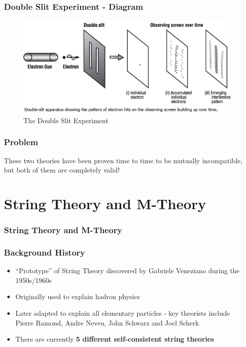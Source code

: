 \documentclass{beamer}
\begin{document}
\begin{frame}
\frametitle{Double Slit Experiment - Diagram}
\begin{figure}
\includegraphics[width=\textwidth]{double-slit-experiment.jpg}
\caption{\label{fig:experiment}The Double Slit Experiment}
\end{figure}

\end{frame}

\begin{frame}
\frametitle{Problem}

These two theories have been proven time to time to be mutually incompatible, but both of them are completely valid!

\end{frame}

\section{String Theory and M-Theory}

\begin{frame}
\frametitle{String Theory and M-Theory}
\end{frame}

\begin{frame}
\frametitle{Background History}
\begin{itemize}
\item ``Prototype'' of String Theory discovered by Gabriele Veneziano during the 1950s/1960s
\item Originally used to explain hadron physics
\item Later adapted to explain all elementary particles - key theorists include Pierre Ramond, Andre Neveu, John Schwarz and Joel Scherk
\item There are currently \bf{5 different self-consistent string theories}
\end{itemize}
\end{frame}
\end{document}
